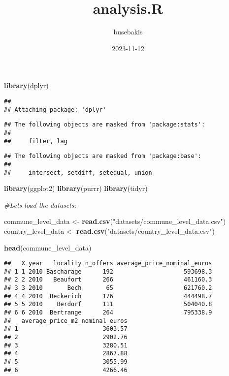 \documentclass[
]{article}
\title{analysis.R}
\author{busebakis}
\date{2023-11-12}
\newenvironment{Shaded}{\begin{snugshade}}{\end{snugshade}}
\newcommand{\CommentTok}[1]{\textcolor[rgb]{0.56,0.35,0.01}{\textit{#1}}}
\newcommand{\FunctionTok}[1]{\textcolor[rgb]{0.13,0.29,0.53}{\textbf{#1}}}
\newcommand{\NormalTok}[1]{#1}
\newcommand{\OtherTok}[1]{\textcolor[rgb]{0.56,0.35,0.01}{#1}}
\newcommand{\StringTok}[1]{\textcolor[rgb]{0.31,0.60,0.02}{#1}}
\begin{document}
\maketitle

\begin{Shaded}
\begin{Highlighting}[]
\FunctionTok{library}\NormalTok{(dplyr)}
\end{Highlighting}
\end{Shaded}

\begin{verbatim}
## 
## Attaching package: 'dplyr'
\end{verbatim}

\begin{verbatim}
## The following objects are masked from 'package:stats':
## 
##     filter, lag
\end{verbatim}

\begin{verbatim}
## The following objects are masked from 'package:base':
## 
##     intersect, setdiff, setequal, union
\end{verbatim}

\begin{Shaded}
\begin{Highlighting}[]
\FunctionTok{library}\NormalTok{(ggplot2)}
\FunctionTok{library}\NormalTok{(purrr)}
\FunctionTok{library}\NormalTok{(tidyr)}

\CommentTok{\#Let\textquotesingle{}s load the datasets:}

\NormalTok{commune\_level\_data }\OtherTok{\textless{}{-}} \FunctionTok{read.csv}\NormalTok{(}\StringTok{"datasets/commune\_level\_data.csv"}\NormalTok{)}
\NormalTok{country\_level\_data }\OtherTok{\textless{}{-}} \FunctionTok{read.csv}\NormalTok{(}\StringTok{"datasets/country\_level\_data.csv"}\NormalTok{)}

\FunctionTok{head}\NormalTok{(commune\_level\_data)}
\end{Highlighting}
\end{Shaded}

\begin{verbatim}
##   X year   locality n_offers average_price_nominal_euros
## 1 1 2010 Bascharage      192                    593698.3
## 2 2 2010   Beaufort      266                    461160.3
## 3 3 2010       Bech       65                    621760.2
## 4 4 2010  Beckerich      176                    444498.7
## 5 5 2010    Berdorf      111                    504040.8
## 6 6 2010  Bertrange      264                    795338.9
##   average_price_m2_nominal_euros
## 1                        3603.57
## 2                        2902.76
## 3                        3280.51
## 4                        2867.88
## 5                        3055.99
## 6                        4266.46
\end{verbatim}
\end{document}
